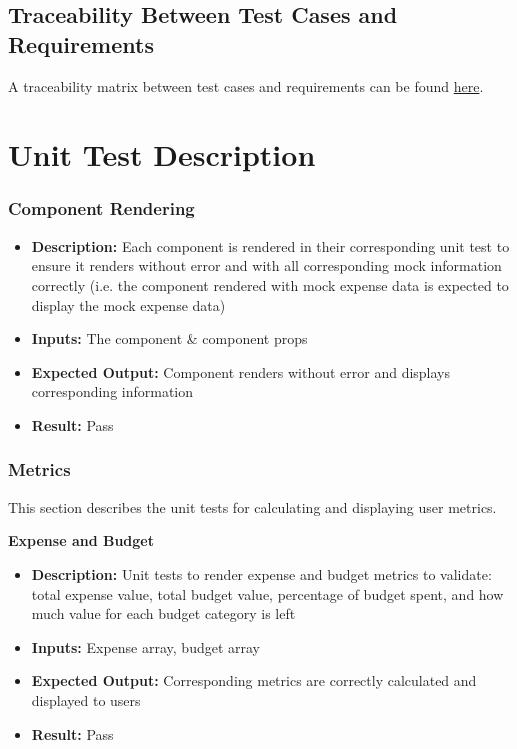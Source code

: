 \documentclass[12pt, titlepage]{article}
\begin{document}
\subsection{Traceability Between Test Cases and Requirements}

A traceability matrix between test cases and requirements can be found
\href{https://github.com/PlutosCapstone/Plutos/blob/main/docs/VnVPlan/traceability_tests_and_requirements.xlsx}{here}.

\newpage

\section{Unit Test Description}

\subsubsection{Component Rendering}

\begin{itemize}
  \item \textbf{Description:} Each component is rendered in their corresponding unit test to ensure it renders without error and with all corresponding mock information correctly
  (i.e. the component rendered with mock expense data is expected to display the mock expense data)
  \item \textbf{Inputs:} The component \& component props
  \item \textbf{Expected Output:} Component renders without error and displays corresponding information
  \item \textbf{Result:} Pass
\end{itemize}

\subsubsection{Metrics}

This section describes the unit tests for calculating and displaying user metrics.

\vspace{10pt}
\textbf{Expense and Budget}

\begin{itemize}
  \item \textbf{Description:} Unit tests to render expense and budget metrics to validate: total expense value, total budget value, percentage of budget spent, and
  how much value for each budget category is left
  \item \textbf{Inputs:} Expense array, budget array
  \item \textbf{Expected Output:} Corresponding metrics are correctly calculated and displayed to users
  \item \textbf{Result:} Pass
\end{itemize}
\end{document}
